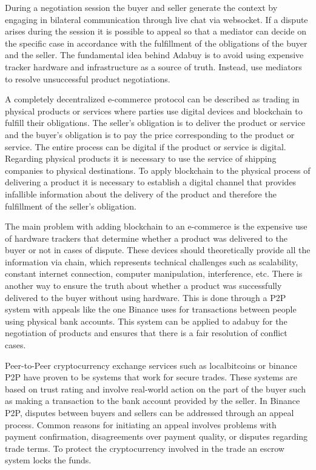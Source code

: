 \documentclass[12pt]{article}
\begin{document}
During a negotiation session the buyer and seller generate the context by engaging in bilateral communication through live chat via websocket.
If a dispute arises during the session it is possible to appeal so that a mediator can decide on the specific case in accordance with the fulfillment of the obligations of the buyer and the seller. The fundamental idea behind Adabuy is to avoid using expensive tracker hardware and infrastructure as a source of truth. Instead, use mediators to resolve unsuccessful product negotiations.

A completely decentralized e-commerce protocol can be described as trading in physical products or services where parties use digital devices and blockchain to fulfill their obligations.
The seller's obligation is to deliver the product or service and the buyer's obligation is to pay the price corresponding to the product or service. 
The entire process can be digital if the product or service is digital.
Regarding physical products it is necessary to use the service of shipping companies to physical destinations.
To apply blockchain to the physical process of delivering a product it is necessary to establish a digital channel that provides infallible information about the delivery of the product and therefore the fulfillment of the seller's obligation. 

The main problem with adding blockchain to an e-commerce is the expensive use of hardware trackers that determine whether a product was delivered to the buyer or not in cases of dispute. These devices should theoretically provide all the information via chain, which represents technical challenges such as scalability, constant internet connection, computer manipulation, interference, etc. There is another way to ensure the truth about whether a product was successfully delivered to the buyer without using hardware. This is done through a P2P system with appeals like the one Binance uses for transactions between people using physical bank accounts. This system can be applied to adabuy for the negotiation of products and ensures that there is a fair resolution of conflict cases.

Peer-to-Peer cryptocurrency exchange services such as localbitcoins or binance P2P have proven to be systems that work for secure trades. These systems are based on trust rating and involve real-world action on the part of the buyer such as making a transaction to the bank account provided by the seller. In Binance P2P, disputes between buyers and sellers can be addressed through an appeal process. Common reasons for initiating an appeal involves problems with payment confirmation, disagreements over payment quality, or disputes regarding trade terms. To protect the cryptocurrency involved in the trade an escrow system locks the funds.
\end{document}
